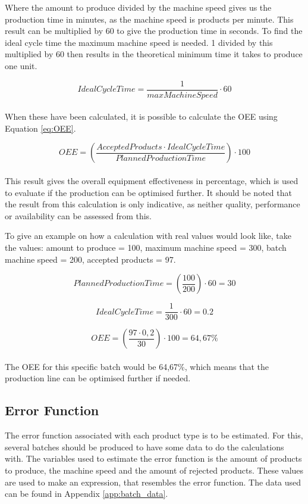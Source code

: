 Where the amount to produce divided by the machine speed gives us the production
time in minutes, as the machine speed is products per minute. This result can be
multiplied by 60 to give the production time in seconds. To find the ideal cycle
time the maximum machine speed is needed. 1 divided by this multiplied by 60
then results in the theoretical minimum time it takes to produce one unit.

\[IdealCycleTime = \frac{1}{maxMachineSpeed}\cdot60\]\\

When these have been calculated, it is possible to calculate the OEE using
Equation \ref{eq:OEE}.

\[OEE = \left(\frac{AcceptedProducts\cdot{IdealCycleTime}}{PlannedProductionTime}\right)\cdot100\]\\

This result gives the overall equipment effectiveness in percentage, which is
used to evaluate if the production can be optimised further. It should be noted
that the result from this calculation is only indicative, as neither quality,
performance or availability can be assessed from this.

To give an example on how a calculation with real values would look like, take
the values: amount to produce = 100, maximum machine speed = 300, batch machine
speed = 200, accepted products = 97.

\[PlannedProductionTime = \left(\frac{100}{200}\right)\cdot60 = 30\]

\[IdealCycleTime = \frac{1}{300}\cdot60=0.2\]

\[OEE = \left(\frac{97\cdot0,2}{30}\right)\cdot100 = 64,67\%\]\\

The OEE for this specific batch would be 64,67\%, which means that the
production line can be optimised further if needed.

\subsection{Error Function}
The error function associated with each product type is to be estimated. For
this, several batches should be produced to have some data to do the
calculations with. The variables used to estimate the error function is the
amount of products to produce, the machine speed and the amount of rejected
products. These values are used to make an expression, that resembles the error
function. The data used can be found in Appendix \ref{app:batch_data}.

